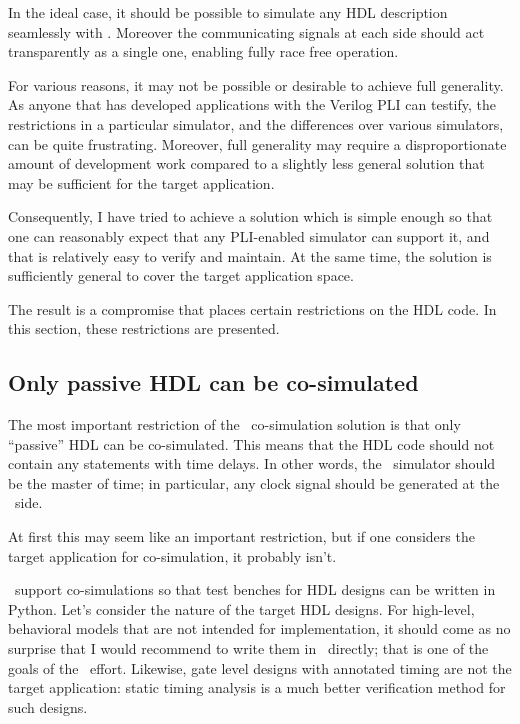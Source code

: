 In the ideal case, it should be possible to simulate
any HDL description seamlessly with \myhdl{}. Moreover
the communicating signals at each side should act
transparently as a single one, enabling fully race free
operation.

For various reasons, it may not be possible or desirable
to achieve full generality. As anyone that has developed
applications with the Verilog PLI can testify, the
restrictions in a particular simulator, and the 
differences over various simulators, can be quite 
frustrating. Moreover, full generality may require
a disproportionate amount of development work compared
to a slightly less general solution that may
be sufficient for the target application.

Consequently, I have tried to achieve a solution
which is simple enough so that one can reasonably 
expect that any PLI-enabled simulator can support it,
and that is relatively easy to verify and maintain.
At the same time, the solution is sufficiently general 
to cover the target application space.

The result is a compromise that places certain restrictions
on the HDL code. In this section, these restrictions 
are presented.

\subsection{Only passive HDL can be co-simulated}

The most important restriction of the \myhdl\ co-simulation solution is
that only ``passive'' HDL can be co-simulated.  This means that the HDL
code should not contain any statements with time delays. In other
words, the \myhdl\ simulator should be the master of time; in
particular, any clock signal should be generated at the \myhdl\ side.

At first this may seem like an important restriction, but if one
considers the target application for co-simulation, it probably
isn't. 

\myhdl\ support co-simulations so that test benches for HDL
designs can be written in Python.
Let's consider the nature of the target HDL designs. For high-level,
behavioral models that are not intended for implementation, it should
come as no surprise that I would recommend to write them in \myhdl\
directly; that is one of the goals of the \myhdl\ effort. Likewise,
gate level designs with annotated timing are not the target
application: static timing analysis is a much better verification
method for such designs.

